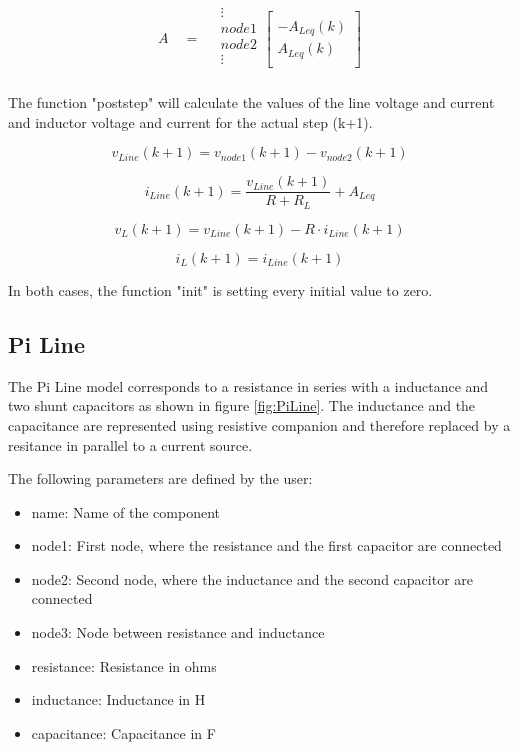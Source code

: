\begin{align} \label{eq:AleqStamp}
\begin{split}
A\quad = \quad
\begin{matrix}
\vdots\\[8pt]
node1\\[8pt]
node2\\[8pt]
\vdots\\
\end{matrix}
\begin{bmatrix}
	\quad \\[8pt]
	-A_{Leq}(k) \\[8pt]
	A_{Leq}(k) \\[8pt]
	\quad
\end{bmatrix}
\end{split}
\end{align}

The function "poststep" will calculate the values of the line voltage and current and inductor voltage and current for the actual step (k+1).

\begin{equation}
	v_{Line}(k+1) = v_{node1}(k+1) - v_{node2}(k+1) 
\end{equation}

\begin{equation}
	i_{Line}(k+1) = \frac{v_{Line}(k+1)}{R+R_L} + A_{Leq} 
\end{equation}

\begin{equation}
	v_L(k+1) = v_{Line}(k+1) - R \cdot i_{Line}(k+1)
\end{equation}

\begin{equation}
	i_L(k+1) = i_{Line}(k+1)
\end{equation}

In both cases, the function "init" is setting every initial value to zero.

\subsection{Pi Line}
The Pi Line model corresponds to a resistance in series with a inductance and two shunt capacitors as shown in figure \ref{fig:PiLine}. The inductance and the capacitance are represented using resistive companion and therefore replaced by a resitance in parallel to a current source.

The following parameters are defined by the user:

\begin{itemize}
\item name: Name of the component
\item node1: First node, where the resistance and the first capacitor are connected
\item node2: Second node, where the inductance and the second capacitor are connected
\item node3: Node between resistance and inductance 
\item resistance: Resistance in ohms
\item inductance: Inductance in H
\item capacitance: Capacitance in F
\end{itemize}

